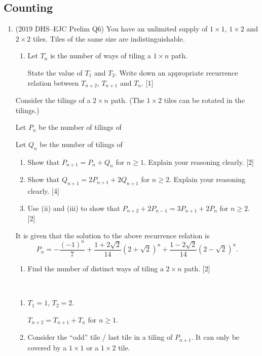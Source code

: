 \subsection{Counting}
\begin{enumerate}
\item (2019 DHS--EJC Prelim Q6) 
You have an unlimited supply of $1\times1$, $1\times2$ and $2\times2$ tiles. Tiles of the same size are indistinguishable.
\begin{enumerate}[label=(\roman*)]
\item Let $T_n$ is the number of ways of tiling a $1\times n$ path.

State the value of $T_1$ and $T_2$. Write down an appropriate recurrence relation between $T_{n+2}$, $T_{n+1}$ and $T_n$. \hfill [1]
\end{enumerate}

Consider the tilings of a $2\times n$ path. (The $1\times2$ tiles can be rotated in the tilings.)

Let $P_n$ be the number of tilings of

Let $Q_n$ be the number of tilings of

\begin{enumerate}[resume*]
\item Show that $P_{n+1}=P_n+Q_n$ for $n\ge1$. Explain your reasoning clearly. \hfill [2]
\item Show that $Q_{n+1}=2P_{n+1}+2Q_{n+1}$ for $n\ge2$. Explain your reasoning clearly. \hfill [4]
\item Use (ii) and (iii) to show that $P_{n+2}+2P_{n-1}=3P_{n+1}+2P_n$ for $n\ge2$. \hfill [2]
\end{enumerate}

It is given that the solution to the above recurrence relation is
\[ P_n=-\frac{(-1)^n}{7}+\frac{1+2\sqrt{2}}{14}(2+\sqrt{2})^n+\frac{1-2\sqrt{2}}{14}(2-\sqrt{2})^n. \]
\begin{enumerate}[resume*]
\item Find the number of distinct ways of tiling a $2\times n$ path. \hfill [2]
\end{enumerate}

\begin{solution} \
\begin{enumerate}[label=(\roman*)]
\item $T_1=1$, $T_2=2$.

$T_{n+2}=T_{n+1}+T_n$ for $n\ge1$.

\item Consider the ``odd'' tile / last tile in a tiling of $P_{n+1}$. It can only be covered by a $1\times1$ or a $1\times2$ tile.


\end{enumerate}
\end{solution}
\end{enumerate}
